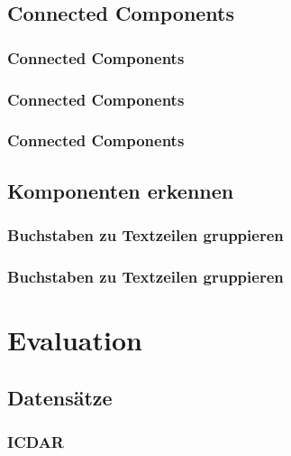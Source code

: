 \documentclass[9pt]{beamer}
\begin{document}
		\subsection{Connected Components}
			\begin{frame}
				\frametitle{Connected Components}
				
		    	\end{frame}
			
			\begin{frame}
				\frametitle{Connected Components}
				
		    	\end{frame}
		    		
		    	\begin{frame}
		    		\frametitle{Connected Components}
		    		
				
			\end{frame}
	
		\subsection{Komponenten erkennen}
			\begin{frame}
				\frametitle{Buchstaben zu Textzeilen gruppieren}
				
			\end{frame}
			
			
			\begin{frame}
				\frametitle{Buchstaben zu Textzeilen gruppieren}
			
			\end{frame}
	
	\section{Evaluation}
		\subsection{Datensätze}
		\begin{frame}
			\frametitle{ICDAR}
		\end{frame}
	
\end{document}
